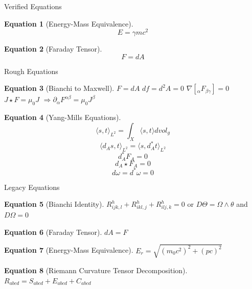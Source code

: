 \documentclass{article}
\theoremstyle{definition}
\newtheorem{equation1}{Equation}
\begin{document}
\begin{section}{Verified Equations}
  \begin{equation1}[Energy-Mass Equivalence]
    $$E = \gamma mc^2 $$
  \end{equation1}

  \begin{equation1}[Faraday Tensor]
    $$F = dA$$
  \end{equation1}

\end{section}

\begin{section}{Rough Equations}

  \begin{equation1}[Bianchi to Maxwell]
    $F =dA$
    \newline $df = d^2A = 0$
    \newline $\nabla[_{\alpha}F_{\beta\gamma}] = 0$
    \newline $J \star F = \mu_0J$
    \newline $\Rightarrow \partial_{\alpha}F^{\alpha \beta} = \mu_0 J^{\beta}$
  \end{equation1}

  \begin{equation1}[Yang-Mills Equations]
    $$\langle s,t \rangle_{L^2} = \int_X \langle s,t \rangle dvol_g$$ $$ \langle d_A s,t \rangle_{L^2} = \langle s, d^*_A t\rangle_{L^2}$$ $$d^*_A F_A = 0$$ $$d_A \star F_A = 0$$ $$d\omega = d^*\omega = 0$$
  \end{equation1}

  \begin{section}{Legacy Equations}

    \begin{equation1}[Bianchi Identity]
      $R^{h}_{ijk,l} + R^{h}_{ikl,j} + R^{h}_{ilj,k} = 0$
      \newline or
      \newline $D\Theta = \Omega \land \theta$ and $D\Omega = 0$
    \end{equation1}

    \begin{equation1}[Faraday Tensor]
      $dA = F$
    \end{equation1}

    \begin{equation1}[Energy-Mass Equivalence]
      $E_r = \sqrt{(m_0c^2 )^2 + (pc)^2}$
    \end{equation1}

  \end{section}

  \begin{equation1}[Riemann Curvature Tensor Decomposition]
    $R_{abcd} = S_{abcd} + E_{abcd} + C_{abcd}$


\end{equation1}
\end{section}
\end{document}
